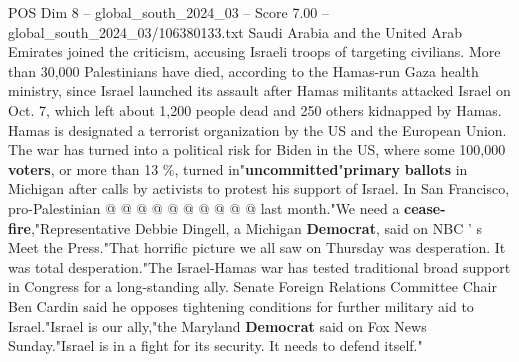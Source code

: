 \begin{textsample}{POS Dim 8 – global\_south\_2024\_03 – Score 7.00 – global\_south\_2024\_03/106380133.txt}
Saudi Arabia and the United Arab Emirates joined the criticism, accusing Israeli troops of targeting civilians.
More than 30,000 Palestinians have died, according to the Hamas-run Gaza health ministry, since Israel launched its assault after Hamas militants attacked Israel on Oct. 7, which left about 1,200 people dead and 250 others kidnapped by Hamas.
Hamas is designated a terrorist organization by the US and the European Union.
The war has turned into a political risk for Biden in the US, where some 100,000 \textbf{voters}, or more than 13 \%, turned in"\textbf{uncommitted}"\textbf{primary} \textbf{ballots} in Michigan after calls by activists to protest his support of Israel.
In San Francisco, pro-Palestinian @ @ @ @ @ @ @ @ @ @ last month."We need a \textbf{cease-fire},"Representative Debbie Dingell, a Michigan \textbf{Democrat}, said on NBC ' s Meet the Press."That horrific picture we all saw on Thursday was desperation.
It was total desperation."The Israel-Hamas war has tested traditional broad support in Congress for a long-standing ally.
Senate Foreign Relations Committee Chair Ben Cardin said he opposes tightening conditions for further military aid to Israel."Israel is our ally,"the Maryland \textbf{Democrat} said on Fox News Sunday."Israel is in a fight for its security.
It needs to defend itself."

\end{textsample}
